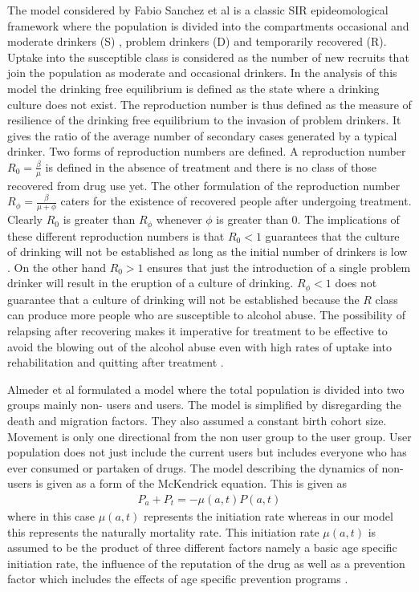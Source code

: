 The model considered by Fabio Sanchez et al  is a classic SIR epideomological framework where the population is divided into the compartments occasional and moderate drinkers (S) , problem drinkers (D) and temporarily recovered (R). Uptake into the susceptible class is considered as the number of new recruits that join the population as moderate and occasional drinkers. In the analysis of this model the drinking free equilibrium is defined as the state where a drinking culture does not exist. The reproduction number is thus  defined as the measure of resilience of the drinking free equilibrium to the invasion of problem drinkers. It gives the ratio of the average number of secondary cases generated by a typical drinker. Two forms of reproduction numbers are defined. A reproduction number $R_0 = \frac{\beta}{\mu}$ is defined in the absence of treatment and there is no class of those recovered from drug use yet. The other formulation of the reproduction number $R_{\phi}=\frac{\beta}{\mu + \phi}$ caters for the existence of recovered people after undergoing treatment. Clearly $R_0$ is greater than $R_{\phi}$ whenever $\phi$ is greater than 0. The implications of these  different reproduction numbers is that $R_0<1$ guarantees that the culture of drinking will not be established as long as the initial number of drinkers is low . On the other hand $R_0>1$ ensures that just the introduction of a single problem drinker will result in the eruption of a culture of drinking. $R_{\phi}<1$ does not guarantee that a culture of drinking will not be established because the $R$ class can produce more people who are  susceptible to alcohol abuse. The possibility of relapsing after recovering makes it imperative for treatment to be effective to avoid the blowing out of the alcohol abuse even with high rates of uptake into rehabilitation and quitting after treatment \cite{alcohol2007}.

Almeder et al formulated a model where the total population is divided into two groups mainly non- users and users. The model is simplified by disregarding the death and migration factors. They also assumed a constant birth cohort size. Movement is only one directional from the non user group to the user group.  User population does not just include the current users but includes everyone who has ever consumed or partaken of drugs.
The model describing the dynamics of non-users is given as a form of the McKendrick equation. This is given as 
\begin{eqnarray}
P_a + P_t = -\mu(a,t) P(a,t)
\end{eqnarray}
where in this case $\mu(a,t)$ represents the initiation rate whereas in our model this represents  the naturally mortality rate. 
This initiation rate $\mu(a,t)$ is assumed to be the product of three different factors namely a basic age specific initiation rate, the influence of the reputation of the drug as well as a prevention factor which includes the effects of age specific prevention programs \cite{agestructureddrug}.













